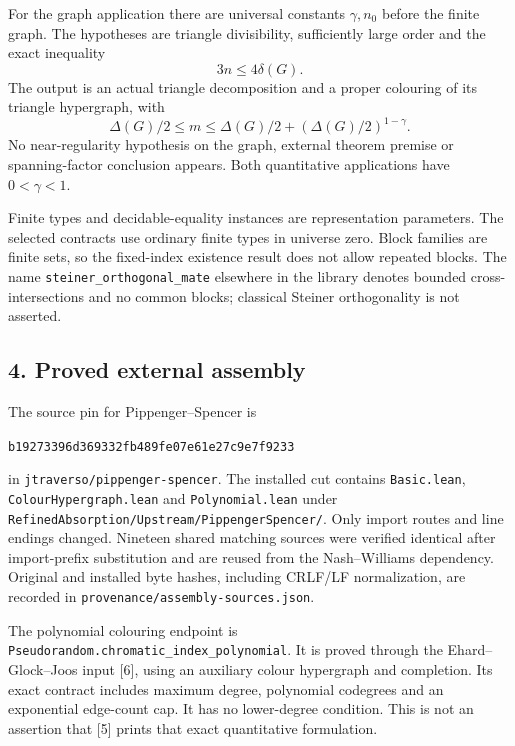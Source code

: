 \documentclass[english,11pt,a4paper]{article}
\begin{document}
For the graph application there are universal constants \(\gamma,n_0\) before the finite graph. The hypotheses are triangle divisibility, sufficiently large order and the exact inequality \[3n\le4\delta(G).\] The output is an actual triangle decomposition and a proper colouring of its triangle hypergraph, with \[\Delta(G)/2\le m
\le\Delta(G)/2+(\Delta(G)/2)^{1-\gamma}.\] No near-regularity hypothesis on the graph, external theorem premise or spanning-factor conclusion appears. Both quantitative applications have \(0<\gamma<1\).

Finite types and decidable-equality instances are representation parameters. The selected contracts use ordinary finite types in universe zero. Block families are finite sets, so the fixed-index existence result does not allow repeated blocks. The name \texttt{steiner\_\allowbreak{}orthogonal\_\allowbreak{}mate} elsewhere in the library denotes bounded cross-intersections and no common blocks; classical Steiner orthogonality is not asserted.

\subsection{4. Proved external assembly}\label{proved-external-assembly}

The source pin for Pippenger--Spencer is

\texttt{b1927339\allowbreak{}6d369332\allowbreak{}fb489fe0\allowbreak{}7e61e27c\allowbreak{}9e7f9233}

in \texttt{jtraverso/\allowbreak{}pippenger-spencer}. The installed cut contains \texttt{Basic.\allowbreak{}lean}, \texttt{Colour\allowbreak{}Hypergraph.\allowbreak{}lean} and \texttt{Polynomial.\allowbreak{}lean} under \texttt{Refined\allowbreak{}Absorption/\allowbreak{}Upstream/\allowbreak{}Pippenger\allowbreak{}Spencer/\allowbreak{}}. Only import routes and line endings changed. Nineteen shared matching sources were verified identical after import-prefix substitution and are reused from the Nash--Williams dependency. Original and installed byte hashes, including CRLF/LF normalization, are recorded in \texttt{provenance/\allowbreak{}assembly-sources.\allowbreak{}json}.

The polynomial colouring endpoint is \texttt{Pseudorandom.\allowbreak{}chromatic\_\allowbreak{}index\_\allowbreak{}polynomial}. It is proved through the Ehard--Glock--Joos input {[}6{]}, using an auxiliary colour hypergraph and completion. Its exact contract includes maximum degree, polynomial codegrees and an exponential edge-count cap. It has no lower-degree condition. This is not an assertion that {[}5{]} prints that exact quantitative formulation.
\end{document}
